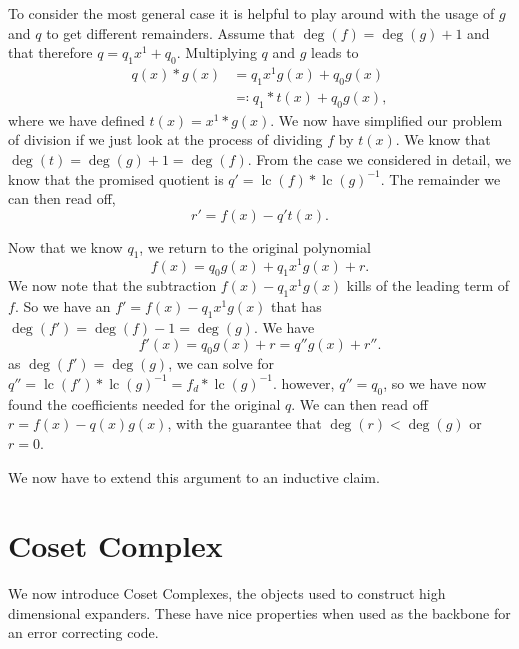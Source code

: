 \documentclass{article}
\DeclareMathOperator{\lc}{lc}
\begin{document}
To consider the most general case it is helpful to play around with the usage of $g$ and $q$ to get different remainders. Assume that $\deg(f) = \deg(g) + 1$ and that therefore $q = q_1 x^1 + q_0$. Multiplying $q$ and $g$ leads to 
\begin{align}
    q(x) * g(x) &= q_1 x^1 g(x) + q_0 g(x) \\
    &\eqqcolon q_1 * t(x) + q_0 g(x),
\end{align}
where we have defined $t(x) = x^1 * g(x)$. We now have simplified our problem of division if we just look at the process of dividing $f$ by $t(x)$. We know that $\deg(t) = \deg(g) + 1 = \deg(f)$. From the case we considered in detail, we know that the promised quotient is $q' = \lc(f) * \lc(g)^{-1}$. The remainder we can then read off,
\begin{equation}
    r' = f(x) - q' t(x).
\end{equation} 

Now that we know $q_1$, we return to the original polynomial
\begin{equation}
    f(x) = q_0 g(x) + q_1 x^1 g(x) + r.
\end{equation}
We now note that the subtraction $f(x) - q_1 x^1 g(x)$ kills of the leading term of $f$. So we have an $f' = f(x) - q_1 x^1 g(x)$ that has $\deg(f') = \deg(f) - 1 = \deg(g)$. We have
\begin{equation}
    f'(x) = q_0 g(x) + r = q'' g(x) + r''.
\end{equation}
as $\deg(f') = \deg(g)$, we can solve for $q'' = \lc(f') * \lc(g)^{-1} = f_{d} * \lc(g)^{-1}$. however, $q'' = q_0$, so we have now found the coefficients needed for the original $q$. We can then read off $r = f(x) - q(x) g(x)$, with the guarantee that $\deg(r) < \deg(g)$ or $r = 0$. 

We now have to extend this argument to an inductive claim.


\section{Coset Complex}
We now introduce Coset Complexes, the objects used to construct high dimensional expanders. These have nice properties when used as the backbone for an error correcting code. 
\end{document}
